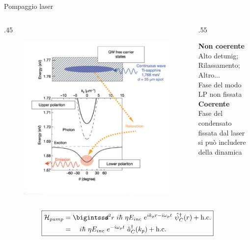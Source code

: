 \documentclass[10pt]{beamer}
\begin{document}
\begin{frame}{Pompaggio laser}
  \begin{columns}
 \begin{column}
  {.45\textwidth}
    \begin{figure}[t]
    \flushleft
     \includegraphics[scale=.18]{files/incoherent.png}
    \end{figure}

 \end{column}
 
 \begin{column}
  {.55\textwidth}

     \textbf{Non coerente}\\
     Alto detunig; Rilassamento; Altro...\\
     Fase del modo LP non fissata\\
     \vskip15pt
     \textbf{Coerente}\\
     Fase del condensato fissata dal laser\\
     si può includere della dinamica
  
 \end{column}
\end{columns}

 \begin{equation*}
 \boxed{
    \begin{align*}
       \ham_{pump} &=\intr i\hbar \ \eta E_{inc} \ e^{ik_p r -i\omega_p t} \ \opsi_C^\dagger (r) +\hc \\
	&= \quad i\hbar \ \eta E_{inc} \ e^{-i\omega_p t} \ \oa_C^\dagger (k_p) +\hc
    \end{align*}
    }
 \end{equation*}
\end{frame}
\end{document}
